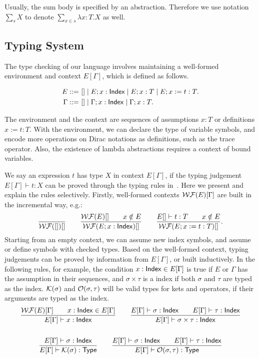 \documentclass[runningheads]{llncs}
\begin{document}
Usually, the sum body is specified by an abstraction. Therefore we use notation $\sum_s X$ to denote $\sum_{x \in s} \lambda x : T . X$ as well.
 


\subsection{Typing System}


The type checking of our language involves maintaining a well-formed environment and context $E[\Gamma]$, which is defined as follows.

\begin{definition}
    \begin{align*}
        E ::=\ & [] \mid E; x : \mathsf{Index} \mid E; x : T \mid E; x := t : T. \\
        \Gamma ::=\ & [] \mid \Gamma; x : \mathsf{Index} \mid \Gamma; x : T.
    \end{align*}
\end{definition}

The environment and the context are sequences of assumptions $x : T$ or definitions $x := t : T$.
With the environment, we can declare the type of variable symbols, and encode more operations on Dirac notations as definitions, such as the trace operator. Also, the existence of lambda abstractions requires a context of bound variables.


We say an expression $t$ has type $X$ in context $E[\Gamma]$, if the typing judgement $E[\Gamma] \vdash t : X$ can be proved through the typing rules in~. Here we present and explain the rules selectively. Firstly, well-formed contexts $\mathcal{WF}(E)[\Gamma]$ are built in the incremental way, e.g.:
\[
    \frac{}{\mathcal{WF}([])[]}
    \qquad
    \frac{\mathcal{WF}(E)[] \qquad x \notin E}{\mathcal{WF}(E; x : \mathsf{Index})[]}
    \qquad
    \frac{E[]\vdash t:T \qquad x \notin E}{\mathcal{WF}(E; x:=t:T)[]}.
\]
Starting from an empty context, we can assume new index symbols, and assume or define symbols with checked types. Based on the well-formed context, typing judgements can be proved by information from $E[\Gamma]$, or built inductively. In the following rules, for example, the condition $x : \mathsf{Index} \in E[\Gamma]$ is true if $E$ or $\Gamma$ has the assumption in their sequences, and $\sigma \times \tau$ is a index if both $\sigma$ and $\tau$ are typed as the index. $\mathcal{K}(\sigma)$ and $\mathcal{O}(\sigma, \tau)$ will be valid types for kets and operators, if their arguments are typed as the index.
\begin{gather*}
    \frac{\mathcal{WF}(E)[\Gamma] \qquad x : \mathsf{Index} \in E[\Gamma]}{E[\Gamma] \vdash x : \mathsf{Index}}
    \qquad
    \frac{E[\Gamma] \vdash \sigma : \mathsf{Index} \qquad E[\Gamma] \vdash \tau : \mathsf{Index}}{E[\Gamma] \vdash \sigma \times \tau : \mathsf{Index}} \\
    \\
    \frac{E[\Gamma] \vdash \sigma : \mathsf{Index}}{E[\Gamma] \vdash \mathcal{K}(\sigma) : \mathsf{Type}}
    \qquad
    \frac{E[\Gamma] \vdash \sigma : \mathsf{Index} \qquad E[\Gamma] \vdash \tau : \mathsf{Index}}{E[\Gamma] \vdash \mathcal{O}(\sigma, \tau) : \mathsf{Type}}
\end{gather*}
\end{document}
